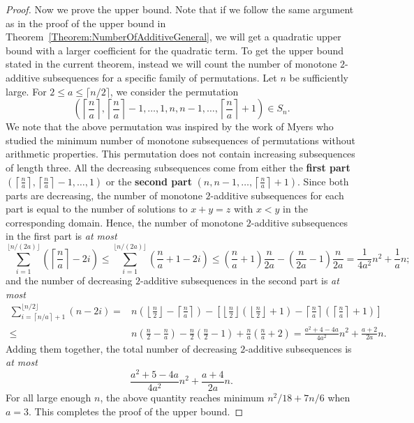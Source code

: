 \documentclass[11pt]{article}
\theoremstyle{definition}
\begin{document}
\begin{proof}
Now we prove the upper bound. Note that if we follow the same argument as in the proof of the upper bound in Theorem~\ref{Theorem:NumberOfAdditiveGeneral}, we will get a quadratic upper bound with a larger coefficient for the quadratic term. To get the upper bound stated in the current theorem, instead we will count the number of monotone $2$-additive subsequences for a specific family of permutations. Let $n$ be sufficiently large. For $2\leq a\leq\lceil n/2\rceil$, we consider the permutation
    \[
    \left(\left\lceil\frac{n}{a}\right\rceil,\left\lceil\frac{n}{a}\right\rceil-1,\ldots,1,n,n-1,\ldots, \left\lceil\frac{n}{a}\right\rceil+1\right)\in S_n.
    \]
    We note that the above permutation was inspired by the work of Myers \cite{Myers2002} who studied the minimum number of monotone subsequences of permutations without arithmetic properties. This permutation does not contain increasing subsequences of length three. All the decreasing subsequences come from either the \textbf{first part} $\left(\left\lceil\frac{n}{a}\right\rceil,\left\lceil\frac{n}{a}\right\rceil-1,\ldots,1\right)$ or the \textbf{second part} $\left(n,n-1,\ldots, \left\lceil\frac{n}{a}\right\rceil+1\right)$. Since both parts are decreasing, the number of monotone $2$-additive subsequences for each part is equal to the number of solutions to $x+y=z$ with $x<y$ in the corresponding domain. Hence, the number of monotone $2$-additive subsequences in the first part is \textit{at most}
    \[
    \sum_{i=1}^{\lfloor n/(2a)\rfloor}\left(\left\lceil\frac{n}{a}\right\rceil-2i\right)\leq\sum_{i=1}^{\lfloor n/(2a)\rfloor}\left(\frac{n}{a}+1-2i\right)\leq\left(\frac{n}{a}+1\right)\frac{n}{2a}-\left(\frac{n}{2a}-1\right)\frac{n}{2a}=\frac{1}{4a^2}n^2+\frac{1}{a}n;
    \]
    and the number of decreasing $2$-additive subsequences in the second part is \textit{at most}
    \[
    \begin{split}
    \sum_{i=\left\lceil n/a\right\rceil+1}^{\lfloor n/2\rfloor}(n-2i)=&n\left(\left\lfloor\frac{n}{2}\right\rfloor-\left\lceil\frac{n}{a}\right\rceil\right)-\left[\left\lfloor\frac{n}{2}\right\rfloor\left(\left\lfloor\frac{n}{2}\right\rfloor+1\right)-\left\lceil\frac{n}{a}\right\rceil\left(\left\lceil\frac{n}{a}\right\rceil+1\right)\right]\\\leq&n\left(\frac{n}{2}-\frac{n}{a}\right)-\frac{n}{2}\left(\frac{n}{2}-1\right)+\frac{n}{a}\left(\frac{n}{a}+2\right)=\frac{a^2+4-4a}{4a^2}n^2+\frac{a+2}{2a}n.
    \end{split}
    \]
    Adding them together, the total number of decreasing $2$-additive subsequences is \textit{at most}
    \[
    \frac{a^2+5-4a}{4a^2}n^2+\frac{a+4}{2a}n.
    \]
    For all large enough $n$, the above quantity reaches minimum $n^2/18+7n/6$ when $a=3$. This completes the proof of the upper bound.
\end{proof}
\end{document}
